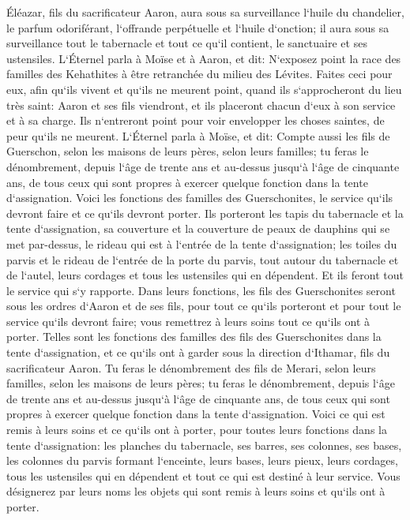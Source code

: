 \verse Éléazar, fils du sacrificateur Aaron, aura sous sa surveillance l`huile du chandelier, le parfum odoriférant, l`offrande perpétuelle et l`huile d`onction; il aura sous sa surveillance tout le tabernacle et tout ce qu`il contient, le sanctuaire et ses ustensiles. 
\verse L`Éternel parla à Moïse et à Aaron, et dit: 
\verse N`exposez point la race des familles des Kehathites à être retranchée du milieu des Lévites. 
\verse Faites ceci pour eux, afin qu`ils vivent et qu`ils ne meurent point, quand ils s`approcheront du lieu très saint: Aaron et ses fils viendront, et ils placeront chacun d`eux à son service et à sa charge. 
\verse Ils n`entreront point pour voir envelopper les choses saintes, de peur qu`ils ne meurent. 
\verse L`Éternel parla à Moïse, et dit: 
\verse Compte aussi les fils de Guerschon, selon les maisons de leurs pères, selon leurs familles; 
\verse tu feras le dénombrement, depuis l`âge de trente ans et au-dessus jusqu`à l`âge de cinquante ans, de tous ceux qui sont propres à exercer quelque fonction dans la tente d`assignation. 
\verse Voici les fonctions des familles des Guerschonites, le service qu`ils devront faire et ce qu`ils devront porter. 
\verse Ils porteront les tapis du tabernacle et la tente d`assignation, sa couverture et la couverture de peaux de dauphins qui se met par-dessus, le rideau qui est à l`entrée de la tente d`assignation; 
\verse les toiles du parvis et le rideau de l`entrée de la porte du parvis, tout autour du tabernacle et de l`autel, leurs cordages et tous les ustensiles qui en dépendent. Et ils feront tout le service qui s`y rapporte. 
\verse Dans leurs fonctions, les fils des Guerschonites seront sous les ordres d`Aaron et de ses fils, pour tout ce qu`ils porteront et pour tout le service qu`ils devront faire; vous remettrez à leurs soins tout ce qu`ils ont à porter. 
\verse Telles sont les fonctions des familles des fils des Guerschonites dans la tente d`assignation, et ce qu`ils ont à garder sous la direction d`Ithamar, fils du sacrificateur Aaron. 
\verse Tu feras le dénombrement des fils de Merari, selon leurs familles, selon les maisons de leurs pères; 
\verse tu feras le dénombrement, depuis l`âge de trente ans et au-dessus jusqu`à l`âge de cinquante ans, de tous ceux qui sont propres à exercer quelque fonction dans la tente d`assignation. 
\verse Voici ce qui est remis à leurs soins et ce qu`ils ont à porter, pour toutes leurs fonctions dans la tente d`assignation: les planches du tabernacle, ses barres, ses colonnes, ses bases, 
\verse les colonnes du parvis formant l`enceinte, leurs bases, leurs pieux, leurs cordages, tous les ustensiles qui en dépendent et tout ce qui est destiné à leur service. Vous désignerez par leurs noms les objets qui sont remis à leurs soins et qu`ils ont à porter. 

